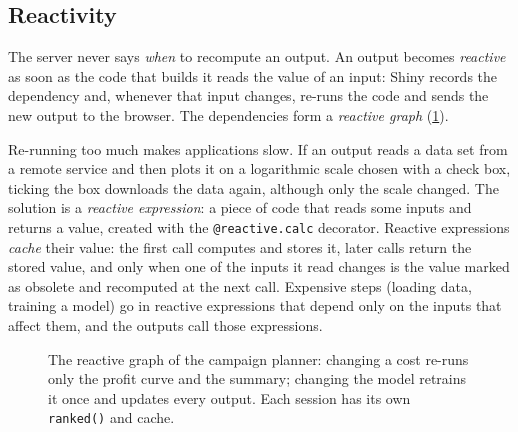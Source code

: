 \subsection{Reactivity}\label{sec:reactivity}

The server never says \emph{when} to recompute an output. An output becomes \emph{reactive} as soon as the code that builds
it reads the value of an input: Shiny records the dependency and, whenever that input changes, re-runs the code and sends the
new output to the browser. The dependencies form a \emph{reactive graph} (\cref{fig:reactivegraph}).

Re-running too much makes applications slow. If an output reads a data set from a remote service and then plots it on a
logarithmic scale chosen with a check box, ticking the box downloads the data again, although only the scale changed. The
solution is a \emph{reactive expression}: a piece of code that reads some inputs and returns a value, created with
the \texttt{@reactive.calc} decorator. Reactive expressions \emph{cache} their value:
the first call computes and stores it, later calls return the stored value, and only when one of the inputs it read changes is
the value marked as obsolete and recomputed at the next call. Expensive steps (loading data, training a model) go in reactive
expressions that depend only on the inputs that affect them, and the outputs call those expressions.

\begin{figure}[htbp]
\centering
{}
\caption{The reactive graph of the campaign planner: changing a cost re-runs only the profit curve and the summary; changing
the model retrains it once and updates every output. Each session has its own \texttt{ranked()} and cache.}
\label{fig:reactivegraph}
\end{figure}

